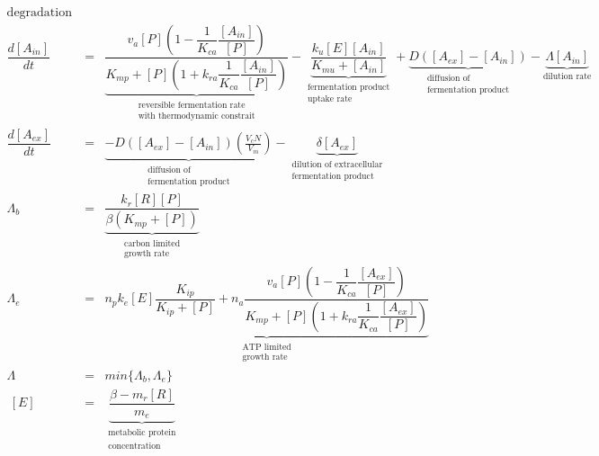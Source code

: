 \documentclass[11pt]{article}
\begin{document}
{\begin{eqnarray}
{{ \text{degradation rate}}} ~\label{eq:dgdt_summary2}\\
	\dfrac{d [A_{in}]}{d t} &=& \underbrace{\dfrac{v_a[P](1-\dfrac{1}{K_{ca}}\dfrac{[A_{in}]}{[P]})}{K_{mp}+[P](1+k_{ra}\dfrac{1}{K_{ca}}\dfrac{[A_{in}]}{[P]})}}_{\substack{\text{reversible fermentation rate} \\ \text{with thermodynamic constrait}}}-\underbrace{\dfrac{k_u[E][A_{in}]}{K_{mu}+[A_{in}]}}_{\substack{\text{fermentation product} \\ \text{uptake rate}}}+ \underbrace{D([A_{ex}]-[A_{in}])}_{\substack{\text{diffusion of} \\ \text{fermentation product}}} - \underbrace{\Lambda [A_{in}]}_{\text{dilution rate}}\\
	\dfrac{d [A_{ex}]}{d t} &=& \underbrace{-D([A_{ex}]-[A_{in}])(\frac{V_cN}{V_m})}_{\substack{\text{diffusion of} \\ \text{fermentation product}}} - \underbrace{\delta [A_{ex}]}_{\substack{\text{dilution of extracellular} \\ \text{fermentation product}}}\\
	\Lambda_{b} &=& \underbrace{\dfrac{k_r[R][P]}{\beta(K_{mp}+[P])}}_{\substack{\text{carbon limited} \\ \text{growth rate}}} \label{eq:growth_rate_summary2}\\
	\Lambda_{e} &=& \underbrace{n_pk_e[E]\dfrac{K_{ip}}{K_{ip}+[P]}+n_a\dfrac{v_a[P](1-\dfrac{1}{K_{ca}}\dfrac{[A_{ex}]}{[P]})}{K_{mp}+[P](1+k_{ra}\dfrac{1}{K_{ca}}\dfrac{[A_{ex}]}{[P]})}}_{\substack{\text{ATP limited} \\ \text{growth rate}}} \label{eq:growth_rate_summary22}\\
	\Lambda &=& min\{\Lambda_{b}, \Lambda_{e}\} \\ 
   ~[E] &=& \underbrace{\dfrac{\beta-m_r[R]}{m_e}}_{\substack{\text{metabolic protein} \\ \text{concentration}}} \label{eq:metab_prot_conc2}
  \end{eqnarray}
  
}
\end{document}
